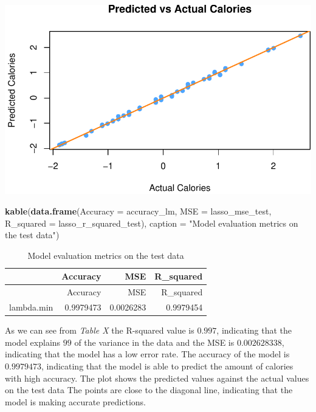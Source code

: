 \documentclass[
]{article}
\newenvironment{Shaded}{\begin{snugshade}}{\end{snugshade}}
\newcommand{\AttributeTok}[1]{\textcolor[rgb]{0.13,0.29,0.53}{#1}}
\newcommand{\FunctionTok}[1]{\textcolor[rgb]{0.13,0.29,0.53}{\textbf{#1}}}
\newcommand{\NormalTok}[1]{#1}
\newcommand{\StringTok}[1]{\textcolor[rgb]{0.31,0.60,0.02}{#1}}
\begin{document}
\begin{center}\includegraphics{Statistical_Learning_Final_Report_files/figure-latex/accuracy_lm-1} \end{center}

\begin{Shaded}
\begin{Highlighting}[]
\FunctionTok{kable}\NormalTok{(}\FunctionTok{data.frame}\NormalTok{(}\AttributeTok{Accuracy =}\NormalTok{ accuracy\_lm, }\AttributeTok{MSE =}\NormalTok{ lasso\_mse\_test, }
                 \AttributeTok{R\_squared =}\NormalTok{ lasso\_r\_squared\_test),}
      \AttributeTok{caption =} \StringTok{"Model evaluation metrics on the test data"}\NormalTok{)}
\end{Highlighting}
\end{Shaded}

\begin{longtable}[]{@{}lrrr@{}}
\caption{Model evaluation metrics on the test data}\tabularnewline
\toprule\noalign{}
& Accuracy & MSE & R\_squared \\
\midrule\noalign{}
\endfirsthead
\toprule\noalign{}
& Accuracy & MSE & R\_squared \\
\midrule\noalign{}
\endhead
\bottomrule\noalign{}
\endlastfoot
lambda.min & 0.9979473 & 0.0026283 & 0.9979454 \\
\end{longtable}

As we can see from \emph{Table X} the R-squared value is \(0.997\),
indicating that the model explains \(99%
\) of the variance in the data and the MSE is \(0.002628338\),
indicating that the model has a low error rate. The accuracy of the
model is \(0.9979473\), indicating that the model is able to predict the
amount of calories with high accuracy. The plot shows the predicted
values against the actual values on the test data The points are close
to the diagonal line, indicating that the model is making accurate
predictions.
\end{document}
